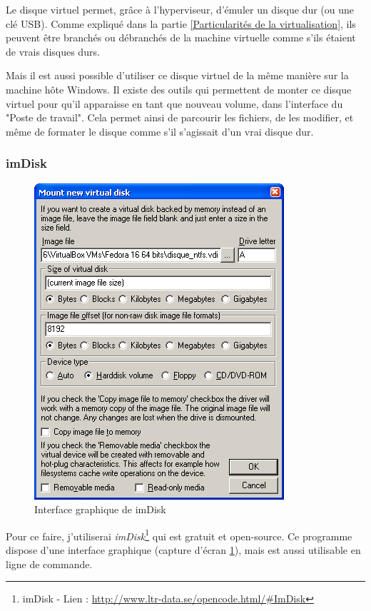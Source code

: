 Le disque virtuel permet, grâce à l'hyperviseur, d'émuler un disque dur (ou une clé USB).
Comme expliqué dans la partie \ref{Particularités de la virtualisation}, ils peuvent être branchés ou débranchés de la machine virtuelle comme s'ils étaient de vrais disques durs.

Mais il est aussi possible d'utiliser ce disque virtuel de la même manière sur la machine hôte Windows.
Il existe des outils qui permettent de monter ce disque virtuel pour qu'il apparaisse en tant que nouveau volume, dans l'interface du "Poste de travail".
Cela permet ainsi de parcourir les fichiers, de les modifier, et même de formater le disque comme s'il s'agissait d'un vrai disque dur.
\\




\subsubsection{imDisk}

\begin{figure}[!h]
	\center
	\includegraphics[scale=0.5]{img/imDisk.png}
	\caption{Interface graphique de imDisk}
	\label{Interface graphique de imDisk}
\end{figure}

Pour ce faire, j'utiliserai \textit{imDisk}\footnote{imDisk - Lien : \href{http://www.ltr-data.se/opencode.html/\#ImDisk}{http://www.ltr-data.se/opencode.html/\#ImDisk}} qui est gratuit et open-source.
Ce programme dispose d'une interface graphique (capture d'écran \ref{Interface graphique de imDisk}), mais est aussi utilisable en ligne de commande.
\\



